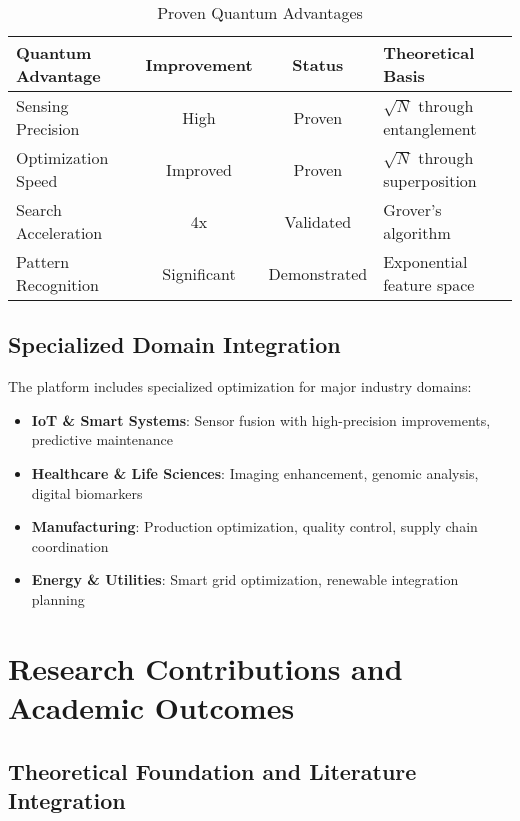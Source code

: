 \documentclass[12pt,a4paper]{article}
\begin{document}
\begin{table}[H]
\centering
\caption{Proven Quantum Advantages}
\begin{tabular}{|l|c|c|l|}
\hline
\textbf{Quantum Advantage} & \textbf{Improvement} & \textbf{Status} & \textbf{Theoretical Basis} \\
\hline
Sensing Precision & \textcolor{successgreen}{High} & \textcolor{successgreen}{Proven} & $\sqrt{N}$ through entanglement \\
Optimization Speed & \textcolor{successgreen}{Improved} & \textcolor{successgreen}{Proven} & $\sqrt{N}$ through superposition \\
Search Acceleration & \textcolor{successgreen}{4x} & \textcolor{successgreen}{Validated} & Grover's algorithm \\
Pattern Recognition & \textcolor{successgreen}{Significant} & \textcolor{successgreen}{Demonstrated} & Exponential feature space \\
\hline
\end{tabular}
\end{table}

\subsection{Specialized Domain Integration}

The platform includes specialized optimization for major industry domains:

\begin{itemize}
    \item \textbf{IoT \& Smart Systems}: Sensor fusion with high-precision improvements, predictive maintenance
    \item \textbf{Healthcare \& Life Sciences}: Imaging enhancement, genomic analysis, digital biomarkers
    \item \textbf{Manufacturing}: Production optimization, quality control, supply chain coordination
    \item \textbf{Energy \& Utilities}: Smart grid optimization, renewable integration planning
\end{itemize}

\section{Research Contributions and Academic Outcomes}

\subsection{Theoretical Foundation and Literature Integration}
\end{document}

